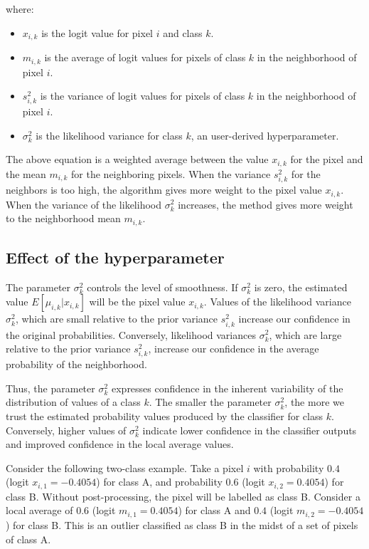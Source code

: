\documentclass[
  shortnames]{jss}
\begin{document}
where:

\begin{itemize}
\item $x_{i,k}$ is the logit value for pixel $i$ and class $k$.
\item $m_{i,k}$ is the average of logit values for pixels of class $k$ 
in the neighborhood of pixel $i$.
\item $s^2_{i,k}$ is the variance of logit values for pixels of class $k$ 
in the neighborhood of pixel $i$.
\item $\sigma^2_{k}$ is the likelihood variance for class $k$, 
an user-derived hyperparameter.
\end{itemize}

The above equation is a weighted average between the value \(x_{i,k}\) for the pixel and the mean \(m_{i,k}\) for the neighboring pixels. When the variance \(s^2_{i,k}\) for the neighbors is too high, the algorithm gives more weight to the pixel value \(x_{i,k}\). When the variance of the likelihood \(\sigma^2_k\) increases, the method gives more weight to the neighborhood mean \(m_{i,k}\).

\hypertarget{effect-of-the-hyperparameter}{%
\subsection{Effect of the hyperparameter}\label{effect-of-the-hyperparameter}}

The parameter \(\sigma^2_k\) controls the level of smoothness. If \(\sigma^2_k\) is zero, the estimated value \({E}[\mu_{i,k} | x_{i,k}]\) will be the pixel value \(x_{i,k}\). Values of the likelihood variance \(\sigma^2_{k}\), which are small relative to the prior variance \(s^2_{i,k}\) increase our confidence in the original probabilities. Conversely, likelihood variances \(\sigma^2_{k}\), which are large relative to the prior variance \(s^2_{i,k}\), increase our confidence in the average probability of the neighborhood.

Thus, the parameter \(\sigma^2_{k}\) expresses confidence in the inherent variability of the distribution of values of a class \(k\). The smaller the parameter \(\sigma^2_{k}\), the more we trust the estimated probability values produced by the classifier for class \(k\).
Conversely, higher values of \(\sigma^2_{k}\) indicate lower confidence in the classifier outputs and improved confidence in the local average values.

Consider the following two-class example. Take a pixel \(i\) with probability \(0.4\) (logit \(x_{i,1} = -0.4054\)) for class A, and probability \(0.6\) (logit \(x_{i,2} = 0.4054\)) for class B. Without post-processing, the pixel will be labelled as class B. Consider a local average of \(0.6\) (logit \(m_{i,1} = 0.4054\)) for class A and \(0.4\) (logit \(m_{i,2} = -0.4054\)) for class B. This is an outlier classified as class B in the midst of a set of pixels of class A.
\end{document}
